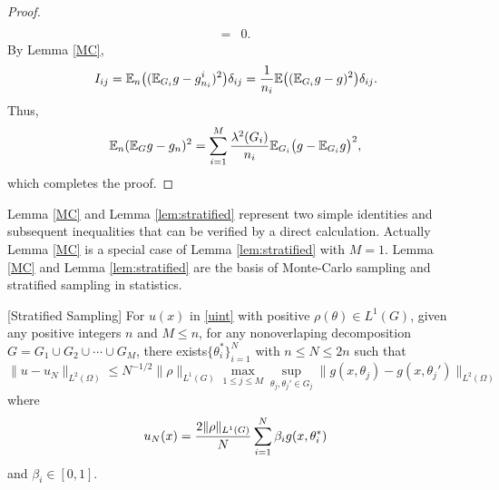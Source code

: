 \begin{proof}
\begin{equation}
\begin{split}
\\
=&0.
\end{split}
\end{equation}
\fi
By Lemma \ref{MC},
\begin{equation}
I_{ij} =  \mathbb{E}_n \big ((\mathbb{E}_{G_i}g -  g^i_{ n_i})^2\big )\delta_{ij}= {1\over n_i} \mathbb{E} \big ((\mathbb{E}_{G_i}g -  g)^2\big )\delta_{ij}.
\end{equation}
Thus,
\begin{equation} 
\mathbb{E}_n(\mathbb{E}_G g -g_n)^2 =\sum_{i=1}^M {\lambda^2(G_i) \over n_i} \mathbb{E}_{G_i}\big (g -\mathbb{E}_{G_i}g\big )^2, 
\end{equation}
which completes the proof.
\end{proof} 

Lemma \ref{MC} and Lemma \ref{lem:stratified} represent two simple identities and subsequent inequalities that can be verified by a direct calculation. Actually Lemma \ref{MC} is a special case of Lemma  \ref{lem:stratified} with $M=1$. Lemma \ref{MC} and Lemma \ref{lem:stratified} are the basis of Monte-Carlo sampling and  stratified sampling in statistics. 

\begin{lemma}\label{lem:stratifiedapprox}
\textup{[Stratified Sampling]}
	For $u(x)$ in \eqref{uint}
	with positive $\rho(\theta)\in L^1(G)$, given any positive integers $n$ and $M\le n$, for  any nonoverlaping decomposition $G=G_1\cup G_2\cup \cdots \cup G_M$, there exists$\{\theta_i^\ast\}_{i=1}^N$ with $n\le N \le 2n$ such that
	\begin{equation} 
	\|u - u_N\|_{L^2(\Omega)} \leq N^{-1/2}\|\rho\|_{L^1(G)}\max_{1\le j\le M}\sup_{\theta_{j},\theta_{j}'\in G_j} \| g(x,\theta_j) - g(x,\theta_j')\|_{L^2(\Omega)} 
	\end{equation}
	where 
	$$
	u_N(x)= {2\|\rho\|_{L^1(G)}\over N}\sum_{i=1}^N\beta_i g(x,\theta_i^\ast)
	$$ 
	and $\beta_i\in [0,1]$.
	\end{lemma}

